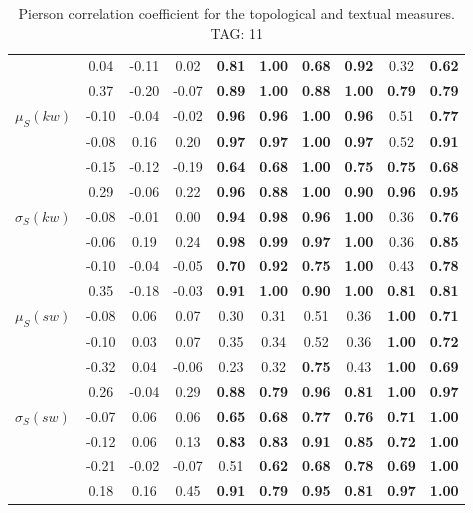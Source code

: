 \begin{table*}[h!]
\begin{center}
\begin{tabular}{| l || c | c | c | c | c | c | c | c | c |}
 & 0.04 & -0.11 & 0.02 & {\bf 0.81} & {\bf 1.00} & {\bf 0.68} & {\bf 0.92} & 0.32 & {\bf 0.62} \\
 & 0.37 & -0.20 & -0.07 & {\bf 0.89} & {\bf 1.00} & {\bf 0.88} & {\bf 1.00} & {\bf 0.79} & {\bf 0.79} \\\hline
$\mu_S(kw)$ & -0.10 & -0.04 & -0.02 & {\bf 0.96} & {\bf 0.96} & {\bf 1.00} & {\bf 0.96} & 0.51 & {\bf 0.77} \\
 & -0.08 & 0.16 & 0.20 & {\bf 0.97} & {\bf 0.97} & {\bf 1.00} & {\bf 0.97} & 0.52 & {\bf 0.91} \\
 & -0.15 & -0.12 & -0.19 & {\bf 0.64} & {\bf 0.68} & {\bf 1.00} & {\bf 0.75} & {\bf 0.75} & {\bf 0.68} \\
 & 0.29 & -0.06 & 0.22 & {\bf 0.96} & {\bf 0.88} & {\bf 1.00} & {\bf 0.90} & {\bf 0.96} & {\bf 0.95} \\\hline
$\sigma_S(kw)$ & -0.08 & -0.01 & 0.00 & {\bf 0.94} & {\bf 0.98} & {\bf 0.96} & {\bf 1.00} & 0.36 & {\bf 0.76} \\
 & -0.06 & 0.19 & 0.24 & {\bf 0.98} & {\bf 0.99} & {\bf 0.97} & {\bf 1.00} & 0.36 & {\bf 0.85} \\
 & -0.10 & -0.04 & -0.05 & {\bf 0.70} & {\bf 0.92} & {\bf 0.75} & {\bf 1.00} & 0.43 & {\bf 0.78} \\
 & 0.35 & -0.18 & -0.03 & {\bf 0.91} & {\bf 1.00} & {\bf 0.90} & {\bf 1.00} & {\bf 0.81} & {\bf 0.81} \\\hline
$\mu_S(sw)$ & -0.08 & 0.06 & 0.07 & 0.30 & 0.31 & 0.51 & 0.36 & {\bf 1.00} & {\bf 0.71} \\
 & -0.10 & 0.03 & 0.07 & 0.35 & 0.34 & 0.52 & 0.36 & {\bf 1.00} & {\bf 0.72} \\
 & -0.32 & 0.04 & -0.06 & 0.23 & 0.32 & {\bf 0.75} & 0.43 & {\bf 1.00} & {\bf 0.69} \\
 & 0.26 & -0.04 & 0.29 & {\bf 0.88} & {\bf 0.79} & {\bf 0.96} & {\bf 0.81} & {\bf 1.00} & {\bf 0.97} \\\hline
$\sigma_S(sw)$ & -0.07 & 0.06 & 0.06 & {\bf 0.65} & {\bf 0.68} & {\bf 0.77} & {\bf 0.76} & {\bf 0.71} & {\bf 1.00} \\
 & -0.12 & 0.06 & 0.13 & {\bf 0.83} & {\bf 0.83} & {\bf 0.91} & {\bf 0.85} & {\bf 0.72} & {\bf 1.00} \\
 & -0.21 & -0.02 & -0.07 & 0.51 & {\bf 0.62} & {\bf 0.68} & {\bf 0.78} & {\bf 0.69} & {\bf 1.00} \\
 & 0.18 & 0.16 & 0.45 & {\bf 0.91} & {\bf 0.79} & {\bf 0.95} & {\bf 0.81} & {\bf 0.97} & {\bf 1.00} \\\hline
\end{tabular}
\caption{Pierson correlation coefficient for the topological and textual measures. TAG: 11}
\end{center}
\end{table*}